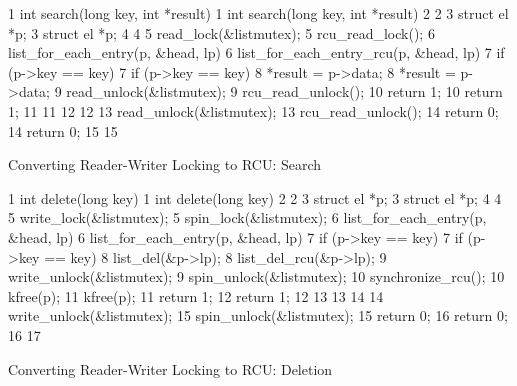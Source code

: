 \begin{listing*}[htbp]
{ \scriptsize
\begin{verbbox}
 1 int search(long key, int *result)     1 int search(long key, int *result)
 2 {                                     2 {
 3   struct el *p;                       3   struct el *p;
 4                                       4
 5   read_lock(&listmutex);              5   rcu_read_lock();
 6   list_for_each_entry(p, &head, lp) { 6   list_for_each_entry_rcu(p, &head, lp) {
 7     if (p->key == key) {              7     if (p->key == key) {
 8       *result = p->data;              8       *result = p->data;
 9       read_unlock(&listmutex);        9       rcu_read_unlock();
10       return 1;                      10       return 1;
11     }                                11     }
12   }                                  12   }
13   read_unlock(&listmutex);           13   rcu_read_unlock();
14   return 0;                          14   return 0;
15 }                                    15 }
\end{verbbox}
}
\hspace*{0.9in}\OneColumnHSpace{-0.5in}
\theverbbox
\caption{Converting Reader-Writer Locking to RCU: Search}
\label{lst:defer:Converting Reader-Writer Locking to RCU: Search}
\end{listing*}

\begin{listing*}[htbp]
{ \scriptsize
\begin{verbbox}
 1 int delete(long key)                  1 int delete(long key)
 2 {                                     2 {
 3   struct el *p;                       3   struct el *p;
 4                                       4
 5   write_lock(&listmutex);             5   spin_lock(&listmutex);
 6   list_for_each_entry(p, &head, lp) { 6   list_for_each_entry(p, &head, lp) {
 7     if (p->key == key) {              7     if (p->key == key) {
 8       list_del(&p->lp);               8       list_del_rcu(&p->lp);
 9       write_unlock(&listmutex);       9       spin_unlock(&listmutex);
                                        10       synchronize_rcu();
10       kfree(p);                      11       kfree(p);
11       return 1;                      12       return 1;
12     }                                13     }
13   }                                  14   }
14   write_unlock(&listmutex);          15   spin_unlock(&listmutex);
15   return 0;                          16   return 0;
16 }                                    17 }
\end{verbbox}
}
\hspace*{0.9in}\OneColumnHSpace{-0.5in}
\theverbbox
\caption{Converting Reader-Writer Locking to RCU: Deletion}
\label{lst:defer:Converting Reader-Writer Locking to RCU: Deletion}
\end{listing*}

